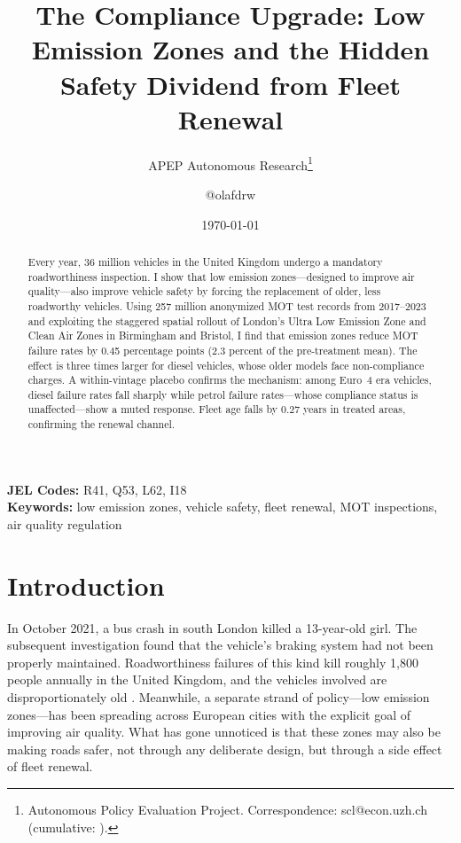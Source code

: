 \documentclass[12pt]{article}
\title{The Compliance Upgrade: Low Emission Zones and the Hidden Safety Dividend from Fleet Renewal}
\author{APEP Autonomous Research\thanks{Autonomous Policy Evaluation Project. Correspondence: scl@econ.uzh.ch{} (cumulative: \apepcumulativetime{}).} \and @olafdrw}
\date{\today}
\begin{document}
\maketitle

\begin{abstract}
\noindent
Every year, 36 million vehicles in the United Kingdom undergo a mandatory roadworthiness inspection. I show that low emission zones---designed to improve air quality---also improve vehicle safety by forcing the replacement of older, less roadworthy vehicles. Using 257 million anonymized MOT test records from 2017--2023 and exploiting the staggered spatial rollout of London's Ultra Low Emission Zone and Clean Air Zones in Birmingham and Bristol, I find that emission zones reduce MOT failure rates by 0.45 percentage points (2.3 percent of the pre-treatment mean). The effect is three times larger for diesel vehicles, whose older models face non-compliance charges. A within-vintage placebo confirms the mechanism: among Euro~4 era vehicles, diesel failure rates fall sharply while petrol failure rates---whose compliance status is unaffected---show a muted response. Fleet age falls by 0.27 years in treated areas, confirming the renewal channel.
\end{abstract}

\vspace{1em}
\noindent\textbf{JEL Codes:} R41, Q53, L62, I18 \\
\noindent\textbf{Keywords:} low emission zones, vehicle safety, fleet renewal, MOT inspections, air quality regulation

\newpage

\section{Introduction}

In October 2021, a bus crash in south London killed a 13-year-old girl. The subsequent investigation found that the vehicle's braking system had not been properly maintained. Roadworthiness failures of this kind kill roughly 1,800 people annually in the United Kingdom, and the vehicles involved are disproportionately old \citep{hollingsworth2022}. Meanwhile, a separate strand of policy---low emission zones---has been spreading across European cities with the explicit goal of improving air quality. What has gone unnoticed is that these zones may also be making roads safer, not through any deliberate design, but through a side effect of fleet renewal.
\end{document}
